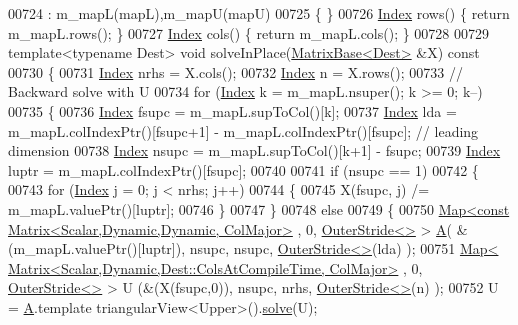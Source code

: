 \begin{DoxyCode}
00724   : m\_mapL(mapL),m\_mapU(mapU)
00725   \{ \}
00726   \hyperlink{namespace_eigen_a62e77e0933482dafde8fe197d9a2cfde}{Index} rows() \{ \textcolor{keywordflow}{return} m\_mapL.rows(); \}
00727   \hyperlink{namespace_eigen_a62e77e0933482dafde8fe197d9a2cfde}{Index} cols() \{ \textcolor{keywordflow}{return} m\_mapL.cols(); \}
00728 
00729   \textcolor{keyword}{template}<\textcolor{keyword}{typename} Dest>   \textcolor{keywordtype}{void} solveInPlace(\hyperlink{group___core___module_class_eigen_1_1_matrix_base}{MatrixBase<Dest>} &X)\textcolor{keyword}{ const}
00730 \textcolor{keyword}{  }\{
00731     \hyperlink{namespace_eigen_a62e77e0933482dafde8fe197d9a2cfde}{Index} nrhs = X.cols();
00732     \hyperlink{namespace_eigen_a62e77e0933482dafde8fe197d9a2cfde}{Index} n    = X.rows();
00733     \textcolor{comment}{// Backward solve with U}
00734     \textcolor{keywordflow}{for} (\hyperlink{namespace_eigen_a62e77e0933482dafde8fe197d9a2cfde}{Index} k = m\_mapL.nsuper(); k >= 0; k--)
00735     \{
00736       \hyperlink{namespace_eigen_a62e77e0933482dafde8fe197d9a2cfde}{Index} fsupc = m\_mapL.supToCol()[k];
00737       \hyperlink{namespace_eigen_a62e77e0933482dafde8fe197d9a2cfde}{Index} lda = m\_mapL.colIndexPtr()[fsupc+1] - m\_mapL.colIndexPtr()[fsupc]; \textcolor{comment}{// leading dimension}
00738       \hyperlink{namespace_eigen_a62e77e0933482dafde8fe197d9a2cfde}{Index} nsupc = m\_mapL.supToCol()[k+1] - fsupc;
00739       \hyperlink{namespace_eigen_a62e77e0933482dafde8fe197d9a2cfde}{Index} luptr = m\_mapL.colIndexPtr()[fsupc];
00740 
00741       \textcolor{keywordflow}{if} (nsupc == 1)
00742       \{
00743         \textcolor{keywordflow}{for} (\hyperlink{namespace_eigen_a62e77e0933482dafde8fe197d9a2cfde}{Index} j = 0; j < nrhs; j++)
00744         \{
00745           X(fsupc, j) /= m\_mapL.valuePtr()[luptr];
00746         \}
00747       \}
00748       \textcolor{keywordflow}{else}
00749       \{
00750         \hyperlink{group___core___module_class_eigen_1_1_map}{Map<const Matrix<Scalar,Dynamic,Dynamic, ColMajor>}
      , 0, \hyperlink{class_eigen_1_1_outer_stride}{OuterStride<>} > \hyperlink{group___core___module_class_eigen_1_1_matrix}{A}( &(m\_mapL.valuePtr()[luptr]), nsupc, nsupc, 
      \hyperlink{class_eigen_1_1_outer_stride}{OuterStride<>}(lda) );
00751         \hyperlink{group___core___module_class_eigen_1_1_map}{Map< Matrix<Scalar,Dynamic,Dest::ColsAtCompileTime, ColMajor>}
      , 0, \hyperlink{class_eigen_1_1_outer_stride}{OuterStride<>} > U (&(X(fsupc,0)), nsupc, nrhs, \hyperlink{class_eigen_1_1_outer_stride}{OuterStride<>}(n) );
00752         U = \hyperlink{group___core___module_class_eigen_1_1_matrix}{A}.template triangularView<Upper>().\hyperlink{group___sparse_core___module_a4a66e9498b06e3ec4ec36f06b26d4e8f}{solve}(U);

\end{DoxyCode}

